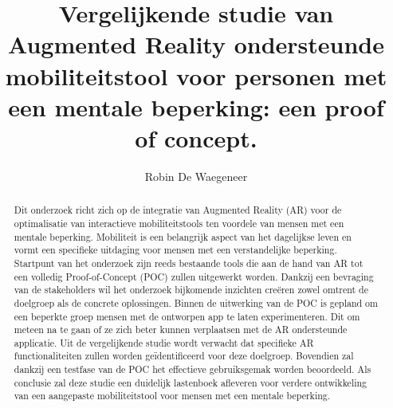 \documentclass{hogent-article}
\title{Vergelijkende studie van Augmented Reality ondersteunde mobiliteitstool voor personen met een mentale beperking: een proof of concept.}
\author{Robin De Waegeneer}
\begin{document}

\begin{abstract}
    Dit onderzoek richt zich op de integratie van Augmented Reality (AR) voor de optimalisatie van interactieve mobiliteitstools ten voordele van mensen met een mentale beperking. 
    Mobiliteit is een belangrijk aspect van het dagelijkse leven en vormt een specifieke uitdaging voor mensen met een verstandelijke beperking. 
    Startpunt van het onderzoek zijn reeds bestaande tools die aan de hand van AR tot een volledig Proof-of-Concept (POC) zullen uitgewerkt worden. 
    Dankzij een bevraging van de stakeholders wil het onderzoek bijkomende inzichten creëren zowel omtrent de doelgroep als de concrete oplossingen. 
    Binnen de uitwerking van de POC is gepland om een beperkte groep mensen met de ontworpen app te laten experimenteren. Dit om meteen na te gaan of ze zich beter kunnen verplaatsen met de AR ondersteunde applicatie. 
    Uit de vergelijkende studie wordt verwacht dat specifieke AR functionaliteiten zullen worden geïdentificeerd voor deze doelgroep. 
    Bovendien zal dankzij een testfase van de POC het effectieve gebruiksgemak worden beoordeeld. 
    Als conclusie zal deze studie een duidelijk lastenboek afleveren voor verdere ontwikkeling van een aangepaste mobiliteitstool voor mensen met een mentale beperking.
\end{abstract}

\tableofcontents



\printbibliography[heading=bibintoc]
\end{document}
